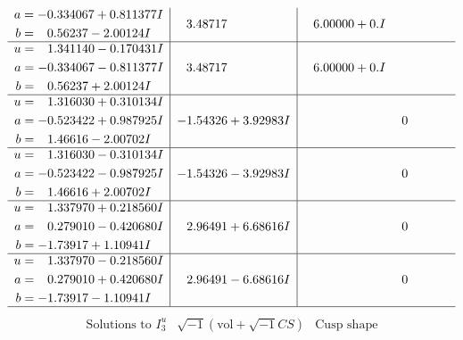 \documentclass[1p]{elsarticle_modified}
\theoremstyle{definition}
\newcommand{\I}{\sqrt{-1}}
\begin{document}
$$\begin{array}{c|c|c}
\begin{aligned}
a &= -0.334067 + 0.811377 I \\
b &= \phantom{-}0.56237 - 2.00124 I\end{aligned}
 & \phantom{-}3.48717\phantom{ +0.000000I} & \phantom{-}6.00000 + 0. I\phantom{ +0.000000I} \\ \hline\begin{aligned}
u &= \phantom{-}1.341140 - 0.170431 I \\
a &= -0.334067 - 0.811377 I \\
b &= \phantom{-}0.56237 + 2.00124 I\end{aligned}
 & \phantom{-}3.48717\phantom{ +0.000000I} & \phantom{-}6.00000 + 0. I\phantom{ +0.000000I} \\ \hline\begin{aligned}
u &= \phantom{-}1.316030 + 0.310134 I \\
a &= -0.523422 + 0.987925 I \\
b &= \phantom{-}1.46616 - 2.00702 I\end{aligned}
 & -1.54326 + 3.92983 I & \phantom{-0.000000 } 0 \\ \hline\begin{aligned}
u &= \phantom{-}1.316030 - 0.310134 I \\
a &= -0.523422 - 0.987925 I \\
b &= \phantom{-}1.46616 + 2.00702 I\end{aligned}
 & -1.54326 - 3.92983 I & \phantom{-0.000000 } 0 \\ \hline\begin{aligned}
u &= \phantom{-}1.337970 + 0.218560 I \\
a &= \phantom{-}0.279010 - 0.420680 I \\
b &= -1.73917 + 1.10941 I\end{aligned}
 & \phantom{-}2.96491 + 6.68616 I & \phantom{-0.000000 } 0 \\ \hline\begin{aligned}
u &= \phantom{-}1.337970 - 0.218560 I \\
a &= \phantom{-}0.279010 + 0.420680 I \\
b &= -1.73917 - 1.10941 I\end{aligned}
 & \phantom{-}2.96491 - 6.68616 I & \phantom{-0.000000 } 0\\
 \hline 
 \end{array}$$\newpage$$\begin{array}{c|c|c}  
\text{Solutions to }I^u_{3}& \I (\text{vol} + \sqrt{-1}CS) & \text{Cusp shape}\\
 \hline 
\begin{aligned}

\end{aligned}
\end{array}$$
\end{document}

